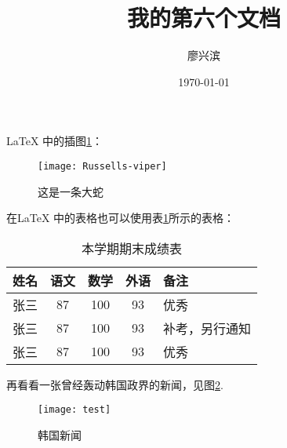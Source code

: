 \documentclass{ctexart}
\title{\heiti 我的第六个文档}
\author{\kaishu 廖兴滨}
\date{\today}
\begin{document}
	\LaTeX{} 中的插图\ref{Russells-viper}： %
	
	\begin{figure}[H]
		\caption{这是一条大蛇}
		\label{Russells-viper}
		\centering
		\texttt{[image: Russells-viper]}
	\end{figure}
	
	
	在\LaTeX{} 中的表格也可以使用表\ref{tab_score}所示的表格：
	
	
	\begin{table}[H]
		\caption{本学期期末成绩表}
		\label{tab_score}
		\centering
		\begin{tabular}{| l | c | c | c | p{2.5cm} |} %
			\hline 
			姓名 & 语文 & 数学 & 外语 & 备注 \\
			\hline 
			张三 & 87 & 100 & 93 & 优秀 \\
			\hline 
			张三 & 87 & 100 & 93 & 补考，另行通知 \\
			\hline 
			张三 & 87 & 100 & 93 & 优秀 \\
			\hline 
		\end{tabular}
	\end{table}

	再看看一张曾经轰动韩国政界的新闻，见图\ref{test}.

	\begin{figure}[H]
		\caption{韩国新闻}
		\label{test}
		\centering
		\texttt{[image: test]}
	\end{figure}
\end{document}
